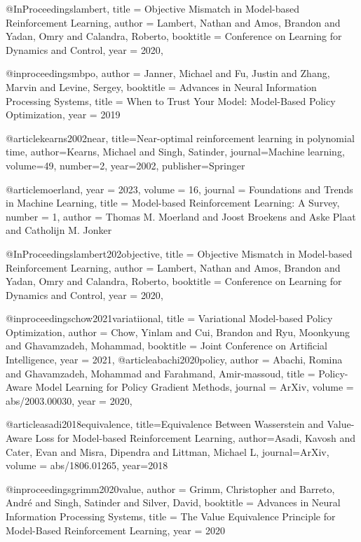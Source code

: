 @InProceedings{lambert,
  title = 	 {Objective Mismatch in Model-based Reinforcement Learning},
  author =       {Lambert, Nathan and Amos, Brandon and Yadan, Omry and Calandra, Roberto},
  booktitle = 	 {Conference on Learning for Dynamics and Control},
  year = 	 {2020},
}

@inproceedings{mbpo,
 author = {Janner, Michael and Fu, Justin and Zhang, Marvin and Levine, Sergey},
 booktitle = {Advances in Neural Information Processing Systems},
 title = {When to Trust Your Model: Model-Based Policy Optimization},
 year = {2019}
}

@article{kearns2002near,
  title={Near-optimal reinforcement learning in polynomial time},
  author={Kearns, Michael and Singh, Satinder},
  journal={Machine learning},
  volume={49},
  number={2},
  year={2002},
  publisher={Springer}
}

@article{moerland,
year = {2023},
volume = {16},
journal = {Foundations and Trends in Machine Learning},
title = {Model-based Reinforcement Learning: A Survey},
number = {1},
author = {Thomas M. Moerland and Joost Broekens and Aske Plaat and Catholijn M. Jonker}}

@InProceedings{lambert202objective,
  title = 	 {Objective Mismatch in Model-based Reinforcement Learning},
  author =       {Lambert, Nathan and Amos, Brandon and Yadan, Omry and Calandra, Roberto},
  booktitle = 	 {Conference on Learning for Dynamics and Control},
  year = 	 {2020},
  }


@inproceedings{chow2021variatiional,
  title     = {Variational Model-based Policy Optimization},
  author    = {Chow, Yinlam and Cui, Brandon and Ryu, Moonkyung and Ghavamzadeh, Mohammad},
  booktitle = {Joint Conference on Artificial Intelligence},
  year      = {2021},
}
@article{abachi2020policy,
  author    = {Abachi, Romina and
            Ghavamzadeh, Mohammad and
            Farahmand, Amir-massoud},
  title     = {Policy-Aware Model Learning for Policy Gradient Methods},
  journal   = {ArXiv},
  volume = {abs/2003.00030},
  year      = {2020},
}

@article{asadi2018equivalence,
  title={Equivalence Between Wasserstein and Value-Aware Loss for Model-based Reinforcement Learning},
  author={Asadi, Kavosh and Cater, Evan and Misra, Dipendra and Littman, Michael L},
  journal={ArXiv},
  volume = {abs/1806.01265},
  year={2018}
}

@inproceedings{grimm2020value,
 author = {Grimm, Christopher and Barreto, Andr{é} and Singh, Satinder and Silver, David},
 booktitle = {Advances in Neural Information Processing Systems},
 title = {The Value Equivalence Principle for Model-Based Reinforcement Learning},
 year = {2020}
}

